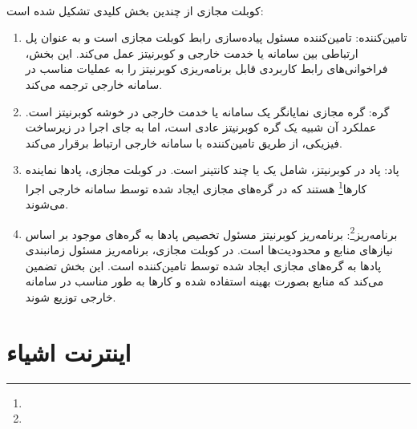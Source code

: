 \paragraph{}
{
    کوبلت مجازی از چندین بخش کلیدی تشکیل شده است:
    \begin{enumerate}
        \item تامین‌کننده: تامین‌کننده مسئول پیاده‌سازی رابط کوبلت مجازی است و به عنوان پل ارتباطی بین سامانه یا خدمت خارجی و کوبرنیتز عمل می‌کند. این بخش، فراخوانی‌های رابط کاربردی قابل برنامه‌ریزی کوبرنیتز را به عملیات مناسب در سامانه خارجی ترجمه می‌کند.
        \item گره: گره مجازی نمایانگر یک سامانه یا خدمت خارجی در خوشه کوبرنیتز است. عملکرد آن شبیه یک گره کوبرنیتز عادی است، اما به جای اجرا در زیرساخت فیزیکی، از طریق تامین‌کننده با سامانه خارجی ارتباط برقرار می‌کند.
        \item پاد: پاد در کوبرنیتز، شامل یک یا چند کانتینر است. در کوبلت مجازی، پادها نماینده کارها\footnote{} هستند که در گره‌های مجازی ایجاد شده توسط سامانه خارجی اجرا می‌شوند.
        \item برنامه‌ریز\footnote{}: برنامه‌ریز کوبرنیتز مسئول تخصیص پادها به گره‌های موجود بر اساس نیازهای منابع و محدودیت‌ها است. در کوبلت مجازی، برنامه‌ریز مسئول زمانبندی پادها به گره‌های مجازی ایجاد شده توسط تامین‌کننده است. این بخش تضمین می‌کند که منابع بصورت بهینه استفاده شده و کارها به طور مناسب در سامانه خارجی توزیع شوند.
    \end{enumerate}
}

\section{اینترنت اشیاء}
\label{sec:iot}
